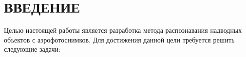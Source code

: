 \chapter*{ВВЕДЕНИЕ}





Целью настоящей работы является разработка метода распознавания надводных объектов с аэрофотоснимков. Для достижения данной цели требуется решить следующие задачи:
